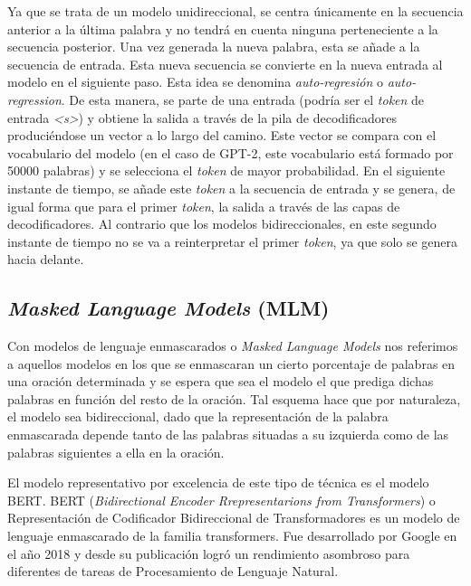 Ya que se trata de un modelo unidireccional, se centra únicamente en la secuencia anterior a la última palabra y no tendrá en cuenta ninguna perteneciente a la secuencia posterior.
Una vez generada la nueva palabra, esta se añade a la secuencia de entrada. Esta nueva secuencia se convierte en la nueva entrada al modelo en el siguiente paso. Esta idea se denomina \textit{auto-regresión} o \textit{auto-regression}. De esta manera, se parte de una entrada (podría ser el \textit{token} de entrada \textit{<s>}) y obtiene la salida a través de la pila de decodificadores produciéndose un vector a lo largo del camino. Este vector se compara con el vocabulario del modelo (en el caso de GPT-2, este vocabulario está formado por 50000 palabras) y se selecciona el \textit{token} de mayor probabilidad. En el siguiente instante de tiempo, se añade este \textit{token} a la secuencia de entrada y se genera, de igual forma que para el primer \textit{token}, la salida a través de las capas de decodificadores. Al contrario que los modelos bidireccionales, en este segundo instante de tiempo no se va a reinterpretar el primer \textit{token}, ya que solo se genera hacia delante.


\subsection{\textit{Masked Language Models} (MLM)}
Con modelos de lenguaje enmascarados o \textit{Masked Language Models} nos referimos a aquellos modelos en los que se enmascaran un cierto porcentaje de palabras en una oración determinada y se espera que sea el modelo el que prediga dichas palabras en función del resto de la oración. Tal esquema hace que por naturaleza, el modelo sea bidireccional, dado que la representación de la palabra enmascarada depende tanto de las palabras situadas a su izquierda como de las palabras siguientes a ella en la oración.

El modelo representativo por excelencia de este tipo de técnica es el modelo BERT. BERT (\textit{Bidirectional Encoder Rrepresentarions from Transformers}) o Representación de Codificador Bidireccional de Transformadores \citep{Devlin2019BERTPO} es un modelo de lenguaje enmascarado de la familia transformers. %
Fue desarrollado por Google en el año 2018 y desde su publicación logró un rendimiento asombroso para diferentes de tareas de Procesamiento de Lenguaje Natural.


